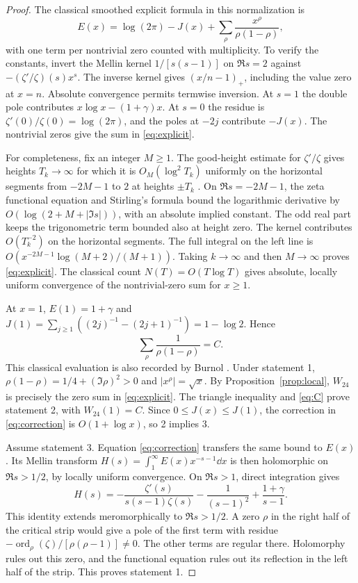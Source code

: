 \begin{proof}
The classical smoothed explicit formula in this normalization is
\begin{equation}
 E(x)=\log(2\pi)-J(x)+
          \sum_\rho\frac{x^\rho}{\rho(1-\rho)}, \label{eq:explicit}
\end{equation}
with one term per nontrivial zero counted with multiplicity. To verify
the constants, invert the Mellin kernel $1/[s(s-1)]$ on $\Re s=2$
against $-(\zeta'/\zeta)(s)x^s$. The inverse kernel gives
$(x/n-1)_+$, including the value zero at $x=n$. Absolute convergence
permits termwise inversion. At $s=1$ the double pole contributes
$x\log x-(1+\gamma)x$. At $s=0$ the residue is
$\zeta'(0)/\zeta(0)=\log(2\pi)$, and the poles at $-2j$ contribute
$-J(x)$. The nontrivial zeros give the sum in \eqref{eq:explicit}.

For completeness, fix an integer $M\geq1$. The good-height estimate
for $\zeta'/\zeta$ gives heights $T_k\to\infty$ for which it is
$O_M(\log^2 T_k)$ uniformly on the horizontal segments from
$-2M-1$ to $2$ at heights $\pm T_k$ \cite[Lemmas 4--5]{kedlaya}.
On $\Re s=-2M-1$, the zeta functional equation and Stirling's formula
bound the logarithmic derivative by $O(\log(2+M+|\Im s|))$,
with an absolute implied constant. The odd real part keeps the
trigonometric term bounded also at height zero. The kernel contributes
$O(T_k^{-2})$ on the horizontal segments. The full integral on the
left line is $O(x^{-2M-1}\log(M+2)/(M+1))$. Taking $k\to\infty$
and then $M\to\infty$ proves \eqref{eq:explicit}.
The classical count $N(T)=O(T\log T)$ gives absolute, locally uniform
convergence of the nontrivial-zero sum for $x\geq1$.

At $x=1$, $E(1)=1+\gamma$ and
$J(1)=\sum_{j\geq1}((2j)^{-1}-(2j+1)^{-1})=1-\log2$.
Hence
\begin{equation}
 \sum_\rho\frac1{\rho(1-\rho)}=C. \label{eq:C}
\end{equation}
This classical evaluation is also recorded by Burnol \cite[p.~3]{burnol}.
Under statement 1, $\rho(1-\rho)=1/4+(\Im\rho)^2>0$ and
$|x^\rho|=\sqrt x$. By Proposition~\ref{prop:local},
$W_{24}$ is precisely the zero sum in \eqref{eq:explicit}. The
triangle inequality and \eqref{eq:C} prove statement 2, with
$W_{24}(1)=C$. Since $0\leq J(x)\leq J(1)$, the correction in
\eqref{eq:correction} is $O(1+\log x)$, so 2 implies 3.

Assume statement 3. Equation \eqref{eq:correction} transfers the same
bound to $E(x)$. Its Mellin transform
$H(s)=\int_1^\infty E(x)x^{-s-1}\dd x$ is then holomorphic on
$\Re s>1/2$, by locally uniform convergence. On $\Re s>1$, direct
integration gives
\[
 H(s)=-\frac{\zeta'(s)}{s(s-1)\zeta(s)}
             -\frac{1}{(s-1)^2}+\frac{1+\gamma}{s-1}.
\]
This identity extends meromorphically to $\Re s>1/2$. A zero
$\rho$ in the right half of the critical strip would give a pole
of the first term with residue $-\operatorname{ord}_\rho(\zeta)/
[\rho(\rho-1)]\ne0$. The other terms are regular there. Holomorphy
rules out this zero, and the functional equation rules out its
reflection in the left half of the strip. This proves statement 1.
\end{proof}
